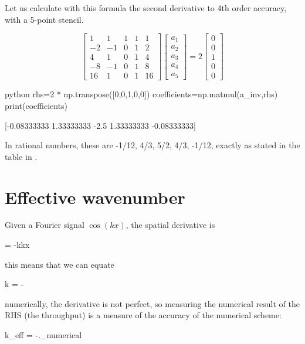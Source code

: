 Let us calculate with this formula the second derivative to 4th order accuracy, with a 5-point stencil.

\begin{equation}
\left[
\begin{array}{ccccc}
1&1&1&1&1\\
-2&-1&0&1&2\\
4&1&0&1&4\\
-8&-1&0&1&8\\
16&1&0&1&16
\end{array}\right]
\left[
\begin{array}{c}
a_1\\
a_2\\
a_3\\
a_4\\
a_5
\end{array}\right]=2\left[
\begin{array}{c}
0\\
0\\
1\\
0\\
0
\end{array}\right]
\end{equation}

\begin{mintedbox}{python}
rhs=2 * np.transpose([0,0,1,0,0])
coefficients=np.matmul(a_inv,rhs) 
print(coefficients)
\end{mintedbox} 

[-0.08333333  1.33333333 -2.5         1.33333333 -0.08333333]

In rational numbers, these are -1/12, 4/3, 5/2, 4/3, -1/12, exactly as
stated in the table in .

\section{Effective wavenumber}

Given a Fourier signal $\cos(kx)$, the spatial derivative is

\beq
{} = -k\sin kx
\eeq

this means that we can equate

\beq
k = - 
\eeq

numerically, the derivative is not perfect, so measuring the numerical
result of the RHS (the throughput) is a measure of the accuracy of the
numerical scheme:

\beq
k_{\rm eff} = -\left.\right\vert_{\rm numerical} 
\eeq


